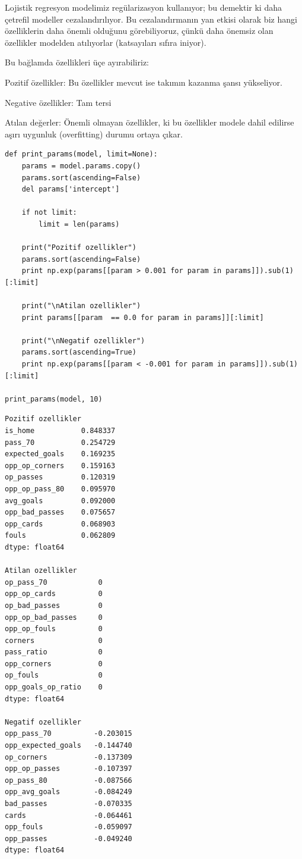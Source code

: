 \documentclass[12pt,fleqn]{article}\usepackage{../../common}
\begin{document}
Lojistik regresyon modelimiz regülarizasyon kullanıyor; bu demektir ki daha
çetrefil modeller cezalandırılıyor. Bu cezalandırmanın yan etkisi olarak
biz hangi özelliklerin daha önemli olduğunu görebiliyoruz, çünkü daha
önemsiz olan özellikler modelden atılıyorlar (katsayıları sıfıra iniyor). 

Bu bağlamda özellikleri üçe ayırabiliriz:

Pozitif özellikler: Bu özellikler mevcut ise takımın kazanma şansı yükseliyor.

Negative özellikler: Tam tersi

Atılan değerler: Önemli olmayan özellikler, ki bu özellikler modele dahil
edilirse aşırı uygunluk (overfitting) durumu ortaya çıkar. 

\begin{verbatim}
def print_params(model, limit=None):    
    params = model.params.copy()
    params.sort(ascending=False)
    del params['intercept']
    
    if not limit:
        limit = len(params)

    print("Pozitif ozellikler")
    params.sort(ascending=False)
    print np.exp(params[[param > 0.001 for param in params]]).sub(1)[:limit]

    print("\nAtilan ozellikler")
    print params[[param  == 0.0 for param in params]][:limit]

    print("\nNegatif ozellikler")
    params.sort(ascending=True)
    print np.exp(params[[param < -0.001 for param in params]]).sub(1)[:limit]

print_params(model, 10)
\end{verbatim}

\begin{verbatim}
Pozitif ozellikler
is_home           0.848337
pass_70           0.254729
expected_goals    0.169235
opp_op_corners    0.159163
op_passes         0.120319
opp_op_pass_80    0.095970
avg_goals         0.092000
opp_bad_passes    0.075657
opp_cards         0.068903
fouls             0.062809
dtype: float64

Atilan ozellikler
op_pass_70            0
opp_op_cards          0
op_bad_passes         0
opp_op_bad_passes     0
opp_op_fouls          0
corners               0
pass_ratio            0
opp_corners           0
op_fouls              0
opp_goals_op_ratio    0
dtype: float64

Negatif ozellikler
opp_pass_70          -0.203015
opp_expected_goals   -0.144740
op_corners           -0.137309
opp_op_passes        -0.107397
op_pass_80           -0.087566
opp_avg_goals        -0.084249
bad_passes           -0.070335
cards                -0.064461
opp_fouls            -0.059097
opp_passes           -0.049240
dtype: float64
\end{verbatim}
\end{document}
